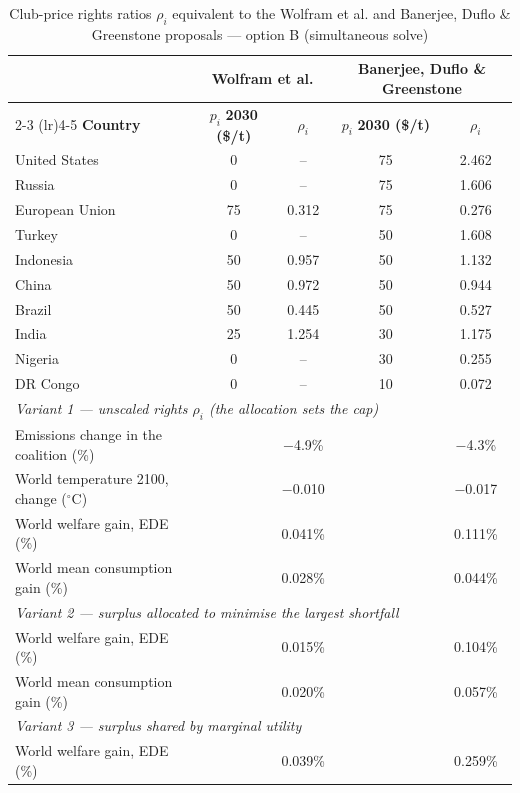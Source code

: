 \begin{table}[htbp]
\centering
\small
\caption{Club-price rights ratios $\rho_i$ equivalent to the Wolfram et al. and Banerjee, Duflo \& Greenstone proposals --- option B (simultaneous solve)}
\renewcommand{\arraystretch}{1.15}
\begin{tabular}{lcccc}
  \toprule
  & \multicolumn{2}{c}{\textbf{Wolfram et al.}} & \multicolumn{2}{c}{\textbf{Banerjee, Duflo \& Greenstone}} \\
  \cmidrule(lr){2-3} \cmidrule(lr){4-5}
  \textbf{Country} & $p_i$ \textbf{2030 (\$/t)} & $\rho_i$ & $p_i$ \textbf{2030 (\$/t)} & $\rho_i$ \\
  \midrule
  United States & 0 & -- & 75 & 2.462 \\
  Russia & 0 & -- & 75 & 1.606 \\
  European Union & 75 & 0.312 & 75 & 0.276 \\
  Turkey & 0 & -- & 50 & 1.608 \\
  Indonesia & 50 & 0.957 & 50 & 1.132 \\
  China & 50 & 0.972 & 50 & 0.944 \\
  Brazil & 50 & 0.445 & 50 & 0.527 \\
  India & 25 & 1.254 & 30 & 1.175 \\
  Nigeria & 0 & -- & 30 & 0.255 \\
  DR Congo & 0 & -- & 10 & 0.072 \\
  \midrule
  \multicolumn{5}{l}{\textit{Variant 1 --- unscaled rights $\rho_i$ (the allocation sets the cap)}} \\
  \quad Emissions change in the coalition (\%) &  & $-$4.9\% &  & $-$4.3\% \\
  \quad World temperature 2100, change ($^\circ$C) &  & $-$0.010 &  & $-$0.017 \\
  \quad World welfare gain, EDE (\%) &  & 0.041\% &  & 0.111\% \\
  \quad World mean consumption gain (\%) &  & 0.028\% &  & 0.044\% \\
  \midrule
  \multicolumn{5}{l}{\textit{Variant 2 --- surplus allocated to minimise the largest shortfall}} \\
  \quad World welfare gain, EDE (\%) &  & 0.015\% &  & 0.104\% \\
  \quad World mean consumption gain (\%) &  & 0.020\% &  & 0.057\% \\
  \midrule
  \multicolumn{5}{l}{\textit{Variant 3 --- surplus shared by marginal utility}} \\
  \quad World welfare gain, EDE (\%) &  & 0.039\% &  & 0.259\% \\

\end{tabular}
\end{table}
